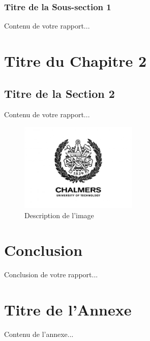 \documentclass[12pt,a4paper]{report}
\begin{document}
\subsection{Titre de la Sous-section 1}



Contenu de votre rapport...

\chapter{Titre du Chapitre 2}
\section{Titre de la Section 2}

Contenu de votre rapport...

\begin{figure}[h!]
    \centering
    \includegraphics[width=0.5\textwidth]{logo_chalmers.jpg}
    \caption{Description de l'image}
    \label{fig:image1}
\end{figure}

\chapter*{Conclusion}

Conclusion de votre rapport...

\newpage
{}



\appendix
\chapter{Titre de l'Annexe}

Contenu de l'annexe...

\pagestyle{plain}
\end{document}
